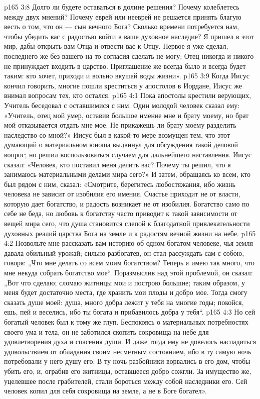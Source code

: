 \vs p165 3:8 Долго ли будете оставаться в долине решения? Почему колеблетесь между двух мнений? Почему еврей или нееврей не решается принять благую весть о том, что он --- сын вечного Бога? Сколько времени потребуется нам, чтобы убедить вас с радостью войти в ваше духовное наследие? Я пришел в этот мир, дабы открыть вам Отца и отвести вас к Отцу. Первое я уже сделал, последнего же без вашего на то согласия сделать не могу; Отец никогда и никого не принуждает входить в царство. Приглашение же всегда было и всегда будет таким: кто хочет, приходи и вольно вкушай воды жизни».
\vs p165 3:9 \pc Когда Иисус кончил говорить, многие пошли креститься у апостолов в Иордане, Иисус же внимал вопросам тех, кто остался.
\vs p165 4:1 Пока апостолы крестили верующих, Учитель беседовал с оставшимися с ним. Один молодой человек сказал ему: «Учитель, отец мой умер, оставив большое имение мне и брату моему, но брат мой отказывается отдать мне мое. Не прикажешь ли брату моему разделить наследство со мной?» Иисус был в какой\hyp{}то мере возмущен тем, что этот думающий о материальном юноша выдвинул для обсуждения такой деловой вопрос; но решил воспользоваться случаем для дальнейшего наставления. Иисус сказал: «Человек, кто поставил меня делить вас? Почему ты решил, что я занимаюсь материальными делами мира сего?» И затем, обращаясь ко всем, кто был рядом с ним, сказал: «Смотрите, берегитесь любостяжания, ибо жизнь человека не зависит от изобилия его имения. Счастье приходит не от власти, которую дает богатство, и радость возникает не от изобилия. Богатство само по себе не беда, но любовь к богатству часто приводит к такой зависимости от вещей мира сего, что душа становится слепой к благодатной привлекательности духовных реалий царства Бога на земле и к радостям вечной жизни на небе.
\vs p165 4:2 \pc Позвольте мне рассказать вам историю об одном богатом человеке, чья земля давала обильный урожай; сильно разбогатев, он стал рассуждать сам с собою, говоря: „Что мне делать со всем моим богатством? Теперь я имею так много, что мне некуда собрать богатство мое“. Поразмыслив над этой проблемой, он сказал: „Вот что сделаю; сломаю житницы мои и построю большие; таким образом, у меня будет достаточно места, где хранить мои плоды и добро мое. Тогда смогу сказать душе моей: душа, много добра лежит у тебя на многие годы; покойся, ешь, пей и веселись, ибо ты богата и прибавилось добра у тебя“.
\vs p165 4:3 Но сей богатый человек был к тому же глуп. Беспокоясь о материальных потребностях своего ума и тела, он не заботился скопить сокровища на небе для удовлетворения духа и спасения души. И даже тогда ему не довелось насладиться удовольствием от обладания своим несметным состоянием, ибо в ту самую ночь потребовали у него душу его. В ту ночь разбойники ворвались в его дом, чтобы убить его, и, ограбив его житницы, оставшееся добро сожгли. За имущество же, уцелевшее после грабителей, стали бороться между собой наследники его. Сей человек копил для себя сокровища на земле, а не в Боге богател».

